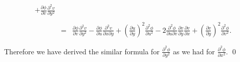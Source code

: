 \documentclass[10pt]{amsart}
\theoremstyle{nonumberplain}
\begin{document}
\begin{enumerate}[label={\bf {\arabic*}:}]
\begin{eqnarray*}
							+ \frac{\partial\phi}{\partial v} \frac{\partial^2 v}{\partial y^2} \\ \\
						&=& \frac{\partial\phi}{\partial v} \frac{\partial^2 v}{\partial y^2} 
							- \frac{\partial\phi}{\partial u} \frac{\partial^2 v}{\partial x \partial y}
							+ \left(\frac{\partial u}{\partial y}\right)^2 \frac{\partial^2 \phi}{\partial u^2}
							-2 \frac{\partial^2 \phi}{\partial u \partial v} \frac{\partial v}{\partial y} \frac{\partial v}{\partial x}
							+ \left(\frac{\partial v}{\partial y}\right)^2 \frac{\partial^2 \phi}{\partial v^2}. \\ \\
\end{eqnarray*}
Therefore we have derived the similar formula for $\frac{\partial^2 \phi }{\partial y^2}$ as we had for $\frac{\partial^2 \phi }{\partial x^2}$.
\qed \\


\end{enumerate}
\end{document}
